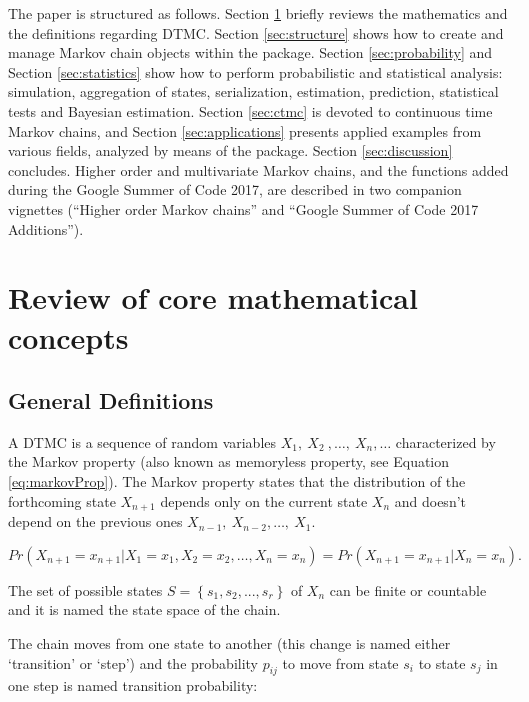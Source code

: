 \documentclass[
  nojss]{jss}
\begin{document}
The paper is structured as follows. Section \ref{sec:mathematics} briefly reviews the mathematics and the definitions regarding DTMC. Section \ref{sec:structure} shows how to create and manage Markov chain objects within the package. Section \ref{sec:probability} and Section \ref{sec:statistics} show how to perform probabilistic and statistical analysis: simulation, aggregation of states, serialization, estimation, prediction, statistical tests and Bayesian estimation. Section \ref{sec:ctmc} is devoted to continuous time Markov chains, and Section \ref{sec:applications} presents applied examples from various fields, analyzed by means of the  package. Section \ref{sec:discussion} concludes. Higher order and multivariate Markov chains, and the functions added during the Google Summer of Code 2017, are described in two companion vignettes (``Higher order Markov chains'' and ``Google Summer of Code 2017 Additions'').

\section{Review of core mathematical concepts}\label{sec:mathematics}

\subsection{General Definitions}\label{general-definitions}

A DTMC is a sequence of random variables \(X_{1},\: X_{2}\: ,\ldots,\:X_{n},\ldots\) characterized by the Markov property (also known as memoryless property, see Equation \ref{eq:markovProp}). The Markov property states that the distribution of the forthcoming state \(X_{n+1}\) depends only on the current state \(X_{n}\) and doesn't depend on the previous ones \(X_{n-1},\: X_{n-2},\ldots,\: X_{1}\).

\begin{equation}
Pr\left(X_{n+1}=x_{n+1}\left|X_{1}=x_{1},X_{2}=x_{2},\ldots,X_{n}=x_{n}\right.\right)=Pr\left(X_{n+1}=x_{n+1}\left|X_{n}=x_{n}\right.\right).
\label{eq:markovProp}
\end{equation}

The set of possible states \(S=\left\{ s_{1},s_{2},...,s_{r}\right\}\) of \(X_{n}\) can be finite or countable and it is named the state space of the chain.

The chain moves from one state to another (this change is named either `transition' or `step') and the probability \(p_{ij}\) to move from state \(s_{i}\) to state \(s_{j}\) in one step is named transition probability:
\end{document}

